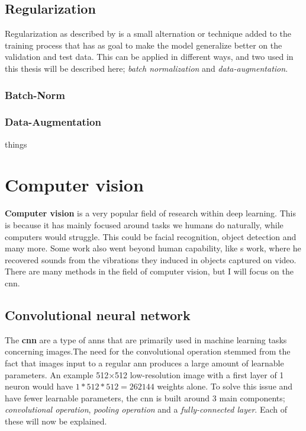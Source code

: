 \subsection{Regularization}
    Regularization as described by \citeauthor{kukavcka2017_regularization}\cite{kukavcka2017_regularization} is a small alternation or technique added to the training process that has as goal to make the model generalize better on the validation and test data. This can be applied in different ways, and two used in this thesis will be described here; \textit{batch normalization} and \textit{data-augmentation}.
    
\subsubsection{Batch-Norm}

\subsubsection{Data-Augmentation}
    things

\clearpage
\section{Computer vision}
    \textbf{Computer vision} is a very popular field of research within deep learning\cite{voulodimos2018deep_computer_vision}. This is because it has mainly focused around tasks we humans do naturally, while computers would struggle. This could be facial recognition, object detection and many more. Some work also went beyond human capability, like \citeauthor{davis2014visual_deep_video_audio}s\cite{davis2014visual_deep_video_audio} work, where he recovered sounds from the vibrations they induced in objects captured on video. There are many methods in the field of computer vision, but I will focus on the \gls{cnn}.
    
    
    
\subsection{Convolutional neural network} \label{cnn}
    The \textbf{\gls{cnn}} are a type of \gls{ann}s that are primarily used in machine learning tasks concerning images\cite{o2015introduction_convolutions}.The need for the convolutional operation stemmed from the fact that images input to a regular \gls{ann} produces a large amount of learnable parameters. An example 512×512 low-resolution image with a first layer of 1 neuron would have $1*512*512 = 262144$ weights alone.  To solve this issue and have fewer learnable parameters, the \gls{cnn} is built around 3 main components\cite{o2015introduction_convolutions}; \textit{convolutional operation}, \textit{pooling operation} and a \textit{fully-connected layer}. Each of these will now be explained.

